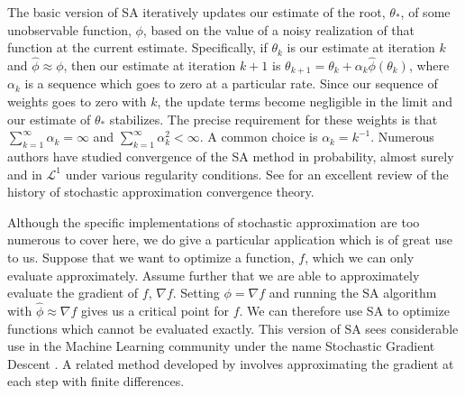 \documentclass[11pt, oneside]{article}   	%
\begin{document}
The basic version of SA iteratively updates our estimate of the root, $\theta_*$, of some unobservable function, $\phi$, based on the value of a noisy realization of that function at the current estimate. Specifically, if $\theta_k$ is our estimate at iteration $k$ and $\hat{\phi} \approx \phi$, then our estimate at iteration $k+1$ is $\theta_{k+1} = \theta_k + \alpha_k \hat{\phi}(\theta_k)$, where $\alpha_k$ is a sequence which goes to zero at a particular rate. Since our sequence of weights goes to zero with $k$, the update terms become negligible in the limit and our estimate of $\theta_*$ stabilizes. The precise requirement for these weights is that $\sum_{k=1}^\infty \alpha_k = \infty$ and $\sum_{k=1}^\infty \alpha_k^2 < \infty$. A common choice is $\alpha_k = k^{-1}$. Numerous authors have studied convergence of the SA method in probability, almost surely and in $\mathcal{L}^1$ under various regularity conditions. See \citet{Lai03} for an excellent review of the history of stochastic approximation convergence theory.

Although the specific implementations of stochastic approximation are too numerous to cover here, we do give a particular application which is of great use to us. Suppose that we want to optimize a function, $f$, which we can only evaluate approximately. Assume further that we are able to approximately evaluate the gradient of $f$, $\nabla f$. Setting $\phi = \nabla f$ and running the SA algorithm with $\hat{\phi} \approx \nabla f$ gives us a critical point for $f$. We can therefore use SA to optimize functions which cannot be evaluated exactly. This version of SA sees considerable use in the Machine Learning community under the name Stochastic Gradient Descent \citep{Bot10}. A related method developed by \citet{Kie52} involves approximating the gradient at each step with finite differences.
\end{document}
